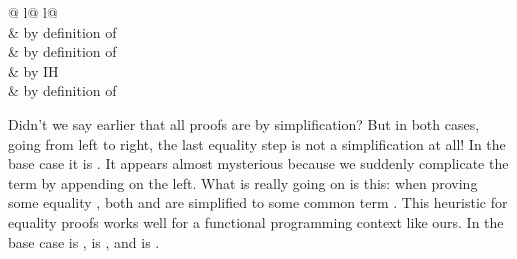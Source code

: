 \begin{isabellebody}
\begin{isamarkuptext}
\begin{itemize}
  \begin{tabular}{@ {}l@ {\quad}l@ {}}
  \\
   & by definition of \\
   & by definition of \\
   & by IH\\
   & by definition of 
  \end{tabular}
\end{itemize}
\medskip

\noindent Didn't we say earlier that all proofs are by simplification? But
in both cases, going from left to right, the last equality step is not a
simplification at all! In the base case it is . It appears almost mysterious because we suddenly complicate the
term by appending  on the left. What is really going on is this:
when proving some equality \mbox{}, both  and  are
simplified to some common term .  This heuristic for equality proofs
works well for a functional programming context like ours. In the base case
 is ,  is , and  is .


\end{isamarkuptext}
\end{isabellebody}
